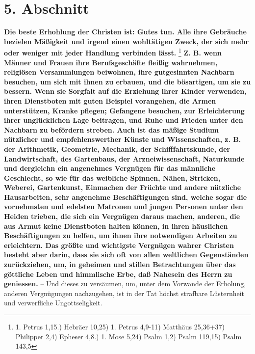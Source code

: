 \section{5. Abschnitt} \label{kap15_ab5}

\label{ref:15_05_freizeitbeschaeftigung}
\textbf{Die beste Erhohlung der Christen ist: Gutes tun. Alle ihre Gebräuche bezielen
Mäßigkeit und irgend einen wohltätigen Zweck, der sich mehr oder weniger mit
jeder Handlung verbinden lässt.}
\footnote{1. Petrus 1,15.) Hebräer 10,25) 1. Petrus 4,9-11)
Matthäus 25,36+37) Philipper 2,4) Epheser 4,8.) 1. Mose 5,24) Psalm 1,2) Psalm 119,15) Psalm 143,5}
\textbf{Z. B. wenn Männer und Frauen ihre Berufsgeschäfte fleißig 
wahrnehmen,
religiösen Versammlungen beiwohnen, ihre gutgesinnten Nachbarn besuchen, um sich
mit ihnen zu erbauen, und die bösartigen, um sie zu bessern. Wenn sie Sorgfalt
auf die Erziehung ihrer Kinder verwenden, ihren 
Dienstboten mit guten Beispiel
vorangehen, die Armen unterstützen, Kranke pflegen; Gefangene 
besuchen, zur
Erleichterung ihrer unglücklichen Lage beitragen, und Ruhe und Frieden unter den
Nachbarn zu befördern streben. Auch ist das mäßige Studium nützlicher und
empfehlenswerther Künste und Wissenschaften, z. B. 
der Arithmetik, Geometrie,
Mechanik, der Schifffahrtskunde, 
der Landwirtschaft, des Gartenbaus, der
Arzneiwissenschaft, Naturkunde und dergleichn ein angenehmes Vergnügen für 
das männliche Geschlecht, so wie für das weibliche 
Spinnen, Nähen, Stricken,
Weberei, Gartenkunst, Einmachen der Früchte und andere nützliche Hausarbeiten,
sehr angenehme Beschäftigungen sind, welche sogar die vornehmsten und edelsten
Matronen und jungen Personen unter den Heiden trieben, die sich ein Vergnügen
daraus machen, anderen, die aus Armut keine Dienstboten halten können, in ihren
häuslichen Beschäftigungen zu helfen, um ihnen ihre notwendigen Arbeiten zu
erleichtern. Das größte und wichtigste Vergnügen wahrer Christen besteht aber
darin, dass sie sich oft von allen weltlichen Gegenständen zurückziehen, um, in
geheimen und stillen Betrachtungen über das 
göttliche Leben und himmlische Erbe,
daß Nahesein des Herrn zu geniessen.} -- Und dieses zu versäumen, um, unter dem
Vorwande der Erholung, anderen Vergnügungen nachzugehen, ist in der Tat höchst
strafbare Lüsternheit und verwerfliche Ungottseligkeit.

